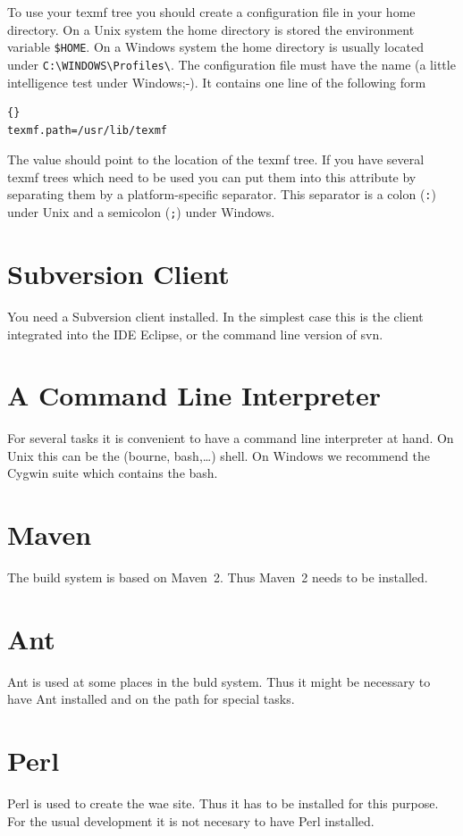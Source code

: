 To use your texmf tree you should create a configuration file in your
home directory. On a Unix system the home directory is stored the
environment variable \verb|$HOME|. On a Windows system the home
directory is usually located under \verb|C:\WINDOWS\Profiles\|.  The
configuration file must have the name  (a little
intelligence test under Windows;-). It contains one line of the
following form

\begin{lstlisting}{}
texmf.path=/usr/lib/texmf
\end{lstlisting}

The value should point to the location of the texmf tree. If you have
several texmf trees which need to be used you can put them into this
attribute by separating them by a platform-specific separator. This
separator is a colon (\verb|:|) under Unix and a semicolon (\verb|;|)
under Windows.


\section{Subversion Client}

You need a Subversion client installed. In the simplest case this is the
client integrated into the IDE Eclipse, or the command line version of svn.


\section{A Command Line Interpreter}

For several tasks it is convenient to have a command line interpreter
at hand. On Unix this can be the (bourne, bash,\ldots) shell. On Windows
we recommend the Cygwin suite which contains the bash.

\section{Maven}

The build system is based on Maven~2. Thus Maven~2 needs to be
installed.



\section{Ant}

Ant is used at some places in the buld system. Thus it might be
necessary to have Ant installed and on the path for special tasks.


\section{Perl}

Perl is used to create the wae site. Thus it has to be installed for this
purpose. For the usual development it is not necesary to have Perl installed.


